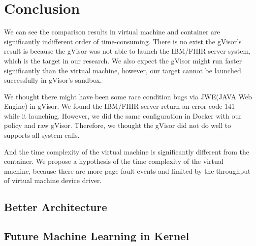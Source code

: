 \chapter{Conclusion}

We can see the comparison results in virtual machine and container are
significantly indifferent order of time-consuming. There is no exist
the gVisor's result is because the gVisor was not able to launch the
IBM/FHIR server system, which is the target in our research.
We also expect the gVisor might run faster significantly than the virtual
machine, however, our target cannot be launched successfully in
gVisor's sandbox.

We thought there might have been some race condition bugs via JWE(JAVA Web
Engine) in gVisor. We found the IBM/FHIR server return an error code $141$
while it launching. However, we did the same configuration in Docker with
our policy and raw gVisor. Therefore, we thought the gVisor did not do
well to supports all system calls.

And the time complexity of the virtual machine is significantly different from
the container. We propose a hypothesis of the time complexity of the virtual
machine, because there are more page fault events and limited by the
throughput of virtual machine device driver\cite{10.5555/1267569.1267570,7095802}.


\section{Better Architecture}

\section{Future Machine Learning in Kernel}
